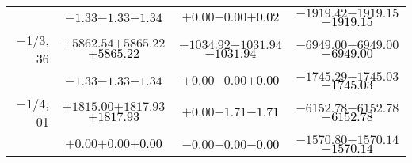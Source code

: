 \documentclass[compress]{beamer}
\begin{document}
\begin{frame}
{\begin{tabular}{r | c | c | c}
           & $-1.33$\hspace{0.1 cm}$-1.33$\hspace{0.1 cm}\textcolor{black}{$-1.34$} & $+0.00$\hspace{0.1 cm}$-0.00$\hspace{0.1 cm}\textcolor{black}{$+0.02$} & $-1919.42$\hspace{0.1 cm}$-1919.15$\hspace{0.1 cm}\textcolor{black}{$-1919.15$} \\
$-$1/3, 36 & $+5862.54$\hspace{0.1 cm}$+5865.22$\hspace{0.1 cm}\textcolor{black}{$+5865.22$} & $-1034.92$\hspace{0.1 cm}$-1031.94$\hspace{0.1 cm}\textcolor{black}{$-1031.94$} & $-6949.00$\hspace{0.1 cm}$-6949.00$\hspace{0.1 cm}\textcolor{black}{$-6949.00$} \\
           & $-1.33$\hspace{0.1 cm}$-1.33$\hspace{0.1 cm}\textcolor{black}{$-1.34$} & $+0.00$\hspace{0.1 cm}$-0.00$\hspace{0.1 cm}\textcolor{black}{$+0.00$} & $-1745.29$\hspace{0.1 cm}$-1745.03$\hspace{0.1 cm}\textcolor{black}{$-1745.03$} \\
$-$1/4, 01 & $+1815.00$\hspace{0.1 cm}$+1817.93$\hspace{0.1 cm}\textcolor{black}{$+1817.93$} & $+0.00$\hspace{0.1 cm}$-1.71$\hspace{0.1 cm}\textcolor{black}{$-1.71$} & $-6152.78$\hspace{0.1 cm}$-6152.78$\hspace{0.1 cm}\textcolor{black}{$-6152.78$} \\
           & $+0.00$\hspace{0.1 cm}$+0.00$\hspace{0.1 cm}\textcolor{black}{$+0.00$} & $-0.00$\hspace{0.1 cm}$-0.00$\hspace{0.1 cm}\textcolor{black}{$-0.00$} & $-1570.80$\hspace{0.1 cm}$-1570.14$\hspace{0.1 cm}\textcolor{black}{$-1570.14$} \\

\end{tabular}}
\end{frame}
\end{document}
